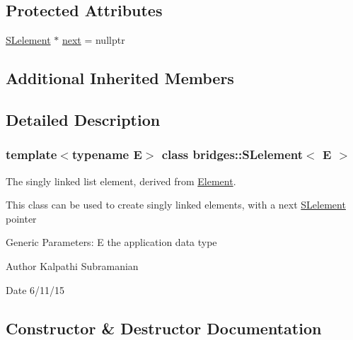 \subsection*{Protected Attributes}
\begin{DoxyCompactItemize}
\item 
\hyperlink{classbridges_1_1_s_lelement}{S\+Lelement} $\ast$ \hyperlink{classbridges_1_1_s_lelement_ad7449d10a09ebc52653a7baed812aa43}{next} = nullptr
\end{DoxyCompactItemize}
\subsection*{Additional Inherited Members}


\subsection{Detailed Description}
\subsubsection*{template$<$typename E$>$\newline
class bridges\+::\+S\+Lelement$<$ E $>$}

The singly linked list element, derived from \hyperlink{classbridges_1_1_element}{Element}. 

This class can be used to create singly linked elements, with a next \hyperlink{classbridges_1_1_s_lelement}{S\+Lelement} pointer

Generic Parameters\+: E the application data type

\begin{DoxyAuthor}{Author}
Kalpathi Subramanian 
\end{DoxyAuthor}
\begin{DoxyDate}{Date}
6/11/15 
\end{DoxyDate}


\subsection{Constructor \& Destructor Documentation}
\hypertarget{classbridges_1_1_s_lelement_a9ddac46a935b85cde76305135d16de0a}{}\label{classbridges_1_1_s_lelement_a9ddac46a935b85cde76305135d16de0a} 
